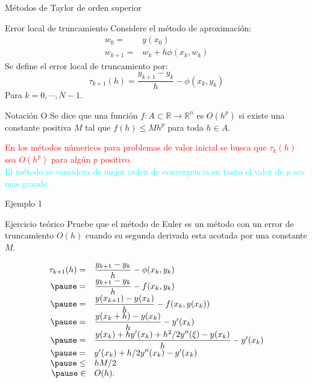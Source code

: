 \begin{frame}{Métodos de Taylor de orden superior }
\begin{block}{Error local de truncamiento}
Considere el método de aproximación:
\begin{align*}
w_0=&y(x_0)\\
w_{k+1}=&w_k+h\phi(x_k,w_k)
\end{align*}
Se define el error local de truncamiento por:
$$\tau_{k+1}(h)=\dfrac{y_{k+1}-y_k}{h}-\phi(x_k,y_k)$$
Para $k=0,\cdots, N-1$.
\end{block}
\begin{block}{Notación O}
Se dice que  una función $f:A\subset\mathbb{R}\rightarrow \mathbb{R}^n$ es $O(h^p)$ si existe una constante positiva $M$ tal que  $f(h)\leq Mh^p$ para toda $h\in A$.
\end{block}
\textcolor{red}{En los métodos númericos para problemas de valor inicial se busca que $\tau_{k}(h)$ sea $O(h^p)$ para algún $p$ positivo.\\\pause }
\textcolor{cyan}{El método se considera de mejor orden de convergencia en tanto el valor de $p$ sea mas grande.}
\end{frame}
\begin{frame}{Ejemplo 1}
\begin{block}{Ejercicio teórico}
Pruebe que el método de Euler es un método  con un error de truncamiento $O(h)$ cuando su segunda derivada esta acotada por una constante $M$.
\end{block}
\begin{displaymath}
\begin{array}{rl}
\tau_{k+1}(h)=&\dfrac{y_{k+1}-y_k}{h}-\phi(x_k,y_k)\\\pause
=&\dfrac{y_{k+1}-y_k}{h}-f(x_k,y_k)\\\pause
=&\dfrac{y(x_{k+1})-y(x_k)}{h}-f(x_k,y(x_k))\\\pause
=&\dfrac{y(x_{k}+h)-y(x_k)}{h}-y'(x_k)\\\pause
=&\dfrac{y(x_{k})+hy'(x_k)+h^2/2y''(\xi)-y(x_k)}{h}-y'(x_k)\\\pause
=&y'(x_k)+h/2y''(x_k)-y'(x_k)\\\pause
\leq & hM/2\\\pause
\in & O(h).
\end{array}
\end{displaymath}
\end{frame}
